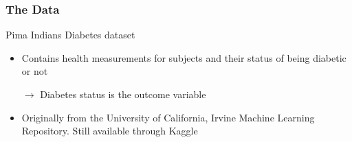 \documentclass{beamer}
\begin{document}
\begin{frame}[fragile]\frametitle{The Data}

	Pima Indians Diabetes dataset
	
	\begin{itemize}
	
		\item Contains health measurements for subjects and their status of being diabetic or not
		
		$ \rightarrow $ Diabetes status is the outcome variable 
		
		\item Originally from the University of California, Irvine Machine Learning Repository. Still available through Kaggle

	\end{itemize}

\end{frame}
\end{document}
